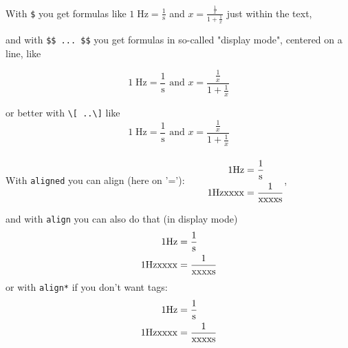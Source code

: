 \documentclass{ximera}
\begin{document}

With \verb|$| you get formulas like 
$1\;\textrm{Hz}=\frac{1}{\textrm{s}}$ and $ x =\frac{\frac1x}{1+\frac{1}{x}}$
just within the text,

and with \verb|$$ ... $$| you get formulas in so-called "display mode", centered on a line, like

$$
1\;\textrm{Hz}=\frac{1}{\textrm{s}} \text{ and } x =\frac{\frac1x}{1+\frac{1}{x}}
$$ 

or better with \verb|\[ ..\]|  like
\[
1\;\textrm{Hz}=\frac{1}{\textrm{s}} \text{ and } x =\frac{\frac1x}{1+\frac{1}{x}}
\] 
\\[1cm]
With \verb|aligned| you can align (here on '='):
$
\begin{aligned}
    \qquad 1 {\rm Hz}      & = \frac{1}{{\rm s}} \\
    \qquad 1 {\rm Hzxxxx}  & = \frac{1}{{\rm xxxxs}}
\end{aligned}
$,

and with \verb|align| you can also do that (in display mode)
\begin{align}
    1 {\rm Hz}      & = \frac{1}{{\rm s}} \\
    1 {\rm Hzxxxx}  & = \frac{1}{{\rm xxxxs}} \\
\end{align}
or with \verb|align*| if you don't want tags:
\begin{align*}
    1 {\rm Hz}      & = \frac{1}{{\rm s}} \\
    1 {\rm Hzxxxx}  & = \frac{1}{{\rm xxxxs}} \\
\end{align*}

\end{document}
